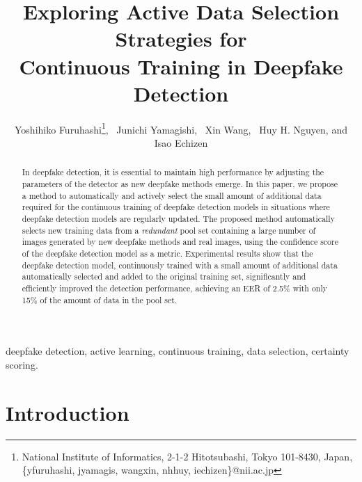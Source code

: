 \documentclass[english]{lni}
\author{Yoshihiko Furuhashi\footnote{National Institute of Informatics, 2-1-2 Hitotsubashi, Tokyo 101-8430, Japan, \{yfuruhashi, jyamagis, wangxin, nhhuy, iechizen\}@nii.ac.jp}, 
\ Junichi Yamagishi\footnotemark[1], 
\ Xin Wang\footnotemark[1], %
\ Huy H. Nguyen\footnotemark[1], 
and Isao Echizen\footnotemark[1]}
\title{Exploring Active Data Selection Strategies for \\ Continuous Training in Deepfake Detection}
\renewcommand{\headrulewidth}{0.4pt} %
\begin{document}
\maketitle

\renewcommand{\refname}{References}
\setcounter{footnote}{2} %
\thispagestyle{titlepage}
\pagestyle{fancy}
\fancyhead{} %
\fancyfoot{} %
\renewcommand{\headrulewidth}{0.4pt} %

\begin{abstract}
In deepfake detection, it is essential to maintain high performance by adjusting the parameters of the detector as new deepfake methods emerge. In this paper, we propose a method to automatically and actively select the small amount of additional data required for the continuous training of deepfake detection models in situations where deepfake detection models are regularly updated. The proposed method automatically selects new training data from a \textit{redundant} pool set containing a large number of images generated by new deepfake methods and real images, using the confidence score of the deepfake detection model as a metric. Experimental results show that the deepfake detection model, continuously trained with a small amount of additional data automatically selected and added to the original training set, significantly and efficiently improved the detection performance, achieving an EER of 2.5\% with only 15\% of the amount of data in the pool set.
\end{abstract}
\begin{keywords}
deepfake detection, active learning, continuous training, data selection, certainty scoring.
\end{keywords}

\section{Introduction}
\end{document}
